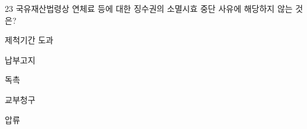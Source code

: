 \begin{question}{23}
국유재산법령상 연체료 등에 대한 징수권의 소멸시효 중단 사유에 해당하지 않는 것은?
\begin{choices}
  \item 제척기간 도과
  \item 납부고지
  \item 독촉
  \item 교부청구
  \item 압류
\end{choices}
\end{question}
